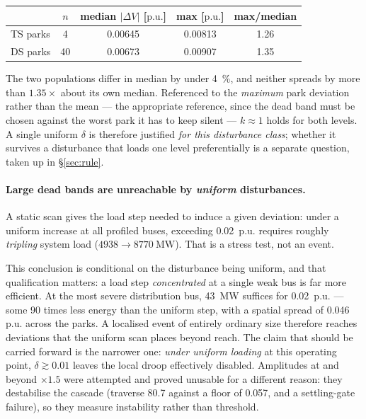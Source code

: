 \documentclass[11pt,a4paper]{article}
\newcommand{\pu}{\ensuremath{\mathrm{p.u.}}}
\newcommand{\dz}{\ensuremath{\delta}}
\begin{document}
\begin{center}
\begin{tabular}{lcccc}
\toprule
 & $n$ & median $|\Delta V|$ [\pu] & max [\pu] & max/median \\
\midrule
TS parks & 4  & 0.00645 & 0.00813 & 1.26 \\
DS parks & 40 & 0.00673 & 0.00907 & 1.35 \\
\bottomrule
\end{tabular}
\end{center}

\noindent The two populations differ in median by under \SI{4}{\percent}, and
neither spreads by more than $1.35\times$ about its own median. Referenced to
the \emph{maximum} park deviation rather than the mean --- the appropriate
reference, since the dead band must be chosen against the worst park it has to
keep silent --- $k \approx 1$ holds for both levels. A single uniform $\dz$ is
therefore justified \emph{for this disturbance class}; whether it survives a
disturbance that loads one level preferentially is a separate question, taken up
in \S\ref{sec:rule}.

\paragraph{Large dead bands are unreachable by \emph{uniform} disturbances.} A
static scan gives the load step needed to induce a given deviation: under a
uniform increase at all profiled buses, exceeding \SI{0.02}{\pu} requires roughly
\emph{tripling} system load ($4938 \rightarrow \SI{8770}{\mega\watt}$). That is a
stress test, not an event.

This conclusion is conditional on the disturbance being uniform, and that
qualification matters: a load step \emph{concentrated} at a single weak bus is
far more efficient. At the most severe distribution bus, \SI{43}{\mega\watt}
suffices for \SI{0.02}{\pu} --- some \num{90} times less energy than the uniform
step, with a spatial spread of \SI{0.046}{\pu} across the parks. A localised
event of entirely ordinary size therefore reaches deviations that the uniform
scan places beyond reach. The claim that should be carried forward is the
narrower one: \emph{under uniform loading} at this operating point,
$\dz \gtrsim 0.01$ leaves the local droop effectively disabled. Amplitudes at and beyond $\times1.5$ were attempted and
proved unusable for a different reason: they destabilise the cascade
(traverse \num{80.7} against a floor of \num{0.057}, and a settling-gate
failure), so they measure instability rather than threshold.
\end{document}
